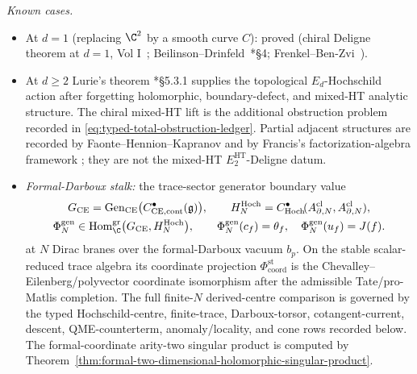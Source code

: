 \begin{conj}
\emph{Known cases.}
\begin{itemize}
  \item At $d=1$ (replacing $\C^2$ by a smooth curve $C$): proved
    (chiral Deligne theorem at \(d=1\),
    Vol I~\cite{lorgat-vol1};
    Beilinson--Drinfeld~\cite{beilinson-drinfeld-chiral}*{\S 4};
    Frenkel--Ben-Zvi~\cite{frenkel-ben-zvi}).
  \item At $d\geq 2$ Lurie's theorem
    \cite{lurie-ha}*{\S 5.3.1} supplies the topological
    \(E_d\)-Hochschild action after forgetting holomorphic,
    boundary-defect, and mixed-HT analytic structure.  The chiral
    mixed-HT lift is the additional obstruction problem recorded in
    \eqref{eq:typed-total-obstruction-ledger}.  Partial adjacent
    structures are recorded by Faonte--Hennion--Kapranov
    \cite{faonte-hennion-kapranov-higher-km} and by Francis's
    factorization-algebra framework \cite{francis-thesis}; they are not
    the mixed-HT \(E_2^{\mathrm{HT}}\)-Deligne datum.
  \item \emph{Formal-Darboux stalk:} the trace-sector generator boundary
    value
    \[
      \begin{gathered}
        G_{\mathrm{CE}}=
        \operatorname{Gen}_{\mathrm{CE}}
        \bigl(C^\bullet_{\mathrm{CE},\mathrm{cont}}(\mathfrak g)\bigr),
        \qquad
        H_N^{\mathrm{Hoch}}=
        C^\bullet_{\mathrm{Hoch}}\!
	      (A^{\mathrm{cl}}_{\partial,N},A^{\mathrm{cl}}_{\partial,N}),
        \\
        \Phi_N^{\mathrm{gen}}\in
        \operatorname{Hom}^{\mathrm{gr}}_\C
        \bigl(G_{\mathrm{CE}},H_N^{\mathrm{Hoch}}\bigr),
        \qquad
        \Phi_N^{\mathrm{gen}}(c_f)=\theta_f,\quad
        \Phi_N^{\mathrm{gen}}(u_f)=J(f).
      \end{gathered}
    \]
    at \(N\) Dirac branes over the formal-Darboux vacuum \(b_p\).
    On the stable scalar-reduced trace algebra its coordinate projection
    \(\Phi_{\mathrm{coord}}^{\mathrm{st}}\) is the
    Chevalley--Eilenberg/polyvector coordinate isomorphism after the
    admissible Tate/pro-Matlis completion.  The full finite-\(N\)
    derived-centre comparison is governed by the typed Hochschild-centre,
    finite-trace, Darboux-torsor, cotangent-current, descent,
    QME-counterterm, anomaly/locality, and cone rows recorded below.  The
    formal-coordinate arity-two singular product is computed by
    Theorem~\ref{thm:formal-two-dimensional-holomorphic-singular-product}.
\end{itemize}
\end{conj}

